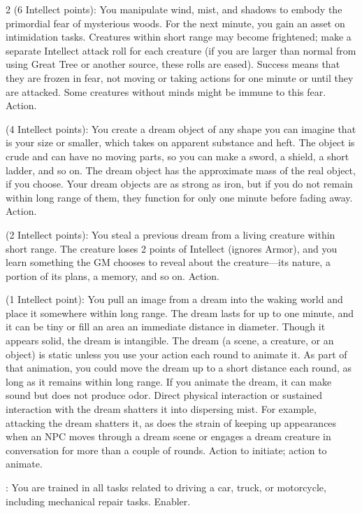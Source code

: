\begin{multicols}{2}
 (6 Intellect points): You manipulate wind, mist, and shadows to embody the primordial fear of mysterious woods. For the next minute, you gain an asset on intimidation tasks. Creatures within short range may become frightened; make a separate Intellect attack roll for each creature (if you are larger than normal from using Great Tree or another source, these rolls are eased). Success means that they are frozen in fear, not moving or taking actions for one minute or until they are attacked. Some creatures without minds might be immune to this fear. Action. 

 (4 Intellect points): You create a dream object of any shape you can imagine that is your size or smaller, which takes on apparent substance and heft. The object is crude and can have no moving parts, so you can make a sword, a shield, a short ladder, and so on. The dream object has the approximate mass of the real object, if you choose. Your dream objects are as strong as iron, but if you do not remain within long range of them, they function for only one minute before fading away. Action. 
 
 (2 Intellect points): You steal a previous dream from a living creature within short range. The creature loses 2 points of Intellect (ignores Armor), and you learn something the GM chooses to reveal about the creature—its nature, a portion of its plans, a memory, and so on. Action. 
 
 (1 Intellect point): You pull an image from a dream into the waking world and place it somewhere within long range. The dream lasts for up to one minute, and it can be tiny or fill an area an immediate distance in diameter. Though it appears solid, the dream is intangible. The dream (a scene, a creature, or an object) is static unless you use your action each round to animate it. As part of that animation, you could move the dream up to a short distance each round, as long as it remains within long range. If you animate the dream, it can make sound but does not produce odor. Direct physical interaction or sustained interaction with the dream shatters it into dispersing mist. For example, attacking the dream shatters it, as does the strain of keeping up appearances when an NPC moves through a dream scene or engages a dream creature in conversation for more than a couple of rounds. Action to initiate; action to animate. 
 
: You are trained in all tasks related to driving a car, truck, or motorcycle, including mechanical repair tasks. Enabler. 
 

\end{multicols}
